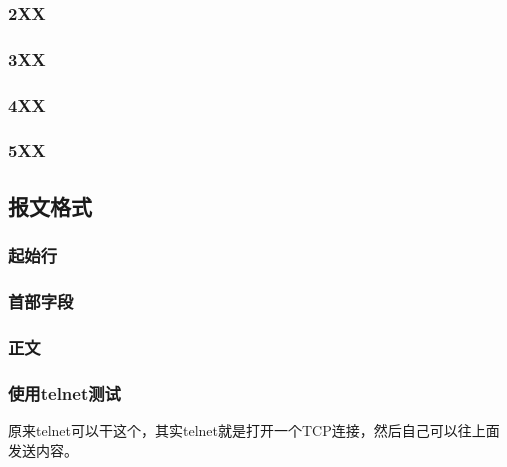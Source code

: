 \subsubsection{2XX}

\subsubsection{3XX}

\subsubsection{4XX}

\subsubsection{5XX}


\subsection{报文格式}


\subsubsection{起始行}

\subsubsection{首部字段}

\subsubsection{正文}


\subsubsection{使用telnet测试}

原来telnet可以干这个，其实telnet就是打开一个TCP连接，然后自己可以往上面发送内容。


